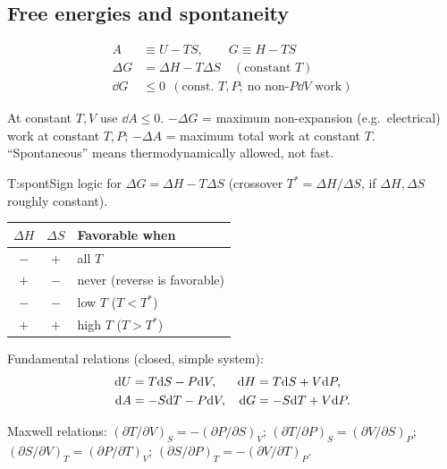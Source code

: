 \begin{multicols}{2}
\subsection{Free energies and spontaneity}\label{sec:freeenergy}
\CORE{}
\begin{formulabox}
\vspace{-6pt}
\begin{align}
A &\equiv U-TS,\qquad G\equiv H-TS \label{F:entropy:AG}\\
\Delta G &= \Delta H-T\Delta S\quad(\text{constant } T) \label{F:entropy:dG}\\
\dd G &\le 0\ \ (\text{const.\ }T,P;\ \text{no non-}P\dd V\text{ work}) \label{F:entropy:criterion}
\end{align}
\end{formulabox}
At constant $T,V$ use $\dd A\le0$. $-\Delta G$ = maximum non-expansion (e.g.\ electrical) work at constant $T,P$; $-\Delta A$ = maximum total work at constant $T$. ``Spontaneous'' means thermodynamically allowed, not fast.

\begin{reftab}{T:spont}{Sign logic for $\Delta G=\Delta H-T\Delta S$ (crossover $T^\ast=\Delta H/\Delta S$, if $\Delta H,\Delta S$ roughly constant).}
\small
\begin{tabularx}{\linewidth}{@{}ccY@{}}
\toprule
$\Delta H$ & $\Delta S$ & Favorable when\\
\midrule
$-$ & $+$ & all $T$\\
$+$ & $-$ & never (reverse is favorable)\\
$-$ & $-$ & low $T$ ($T<T^\ast$)\\
$+$ & $+$ & high $T$ ($T>T^\ast$)\\
\bottomrule
\end{tabularx}\end{reftab}

\begin{formulabox}Fundamental relations (closed, simple system):
\begin{align}
\mathrm{d} U&=T\mathrm{d} S-P\mathrm{d} V, & \mathrm{d} H&=T\mathrm{d} S+V\mathrm{d} P, \notag\\
\mathrm{d} A&=-S\mathrm{d} T-P\mathrm{d} V, & \mathrm{d} G&=-S\mathrm{d} T+V\mathrm{d} P. \label{F:entropy:fundamental}
\end{align}
\end{formulabox}
\EXT{} Maxwell relations: $(\partial T/\partial V)_S=-(\partial P/\partial S)_V$; $(\partial T/\partial P)_S=(\partial V/\partial S)_P$; $(\partial S/\partial V)_T=(\partial P/\partial T)_V$; $(\partial S/\partial P)_T=-(\partial V/\partial T)_P$.


\end{multicols}
